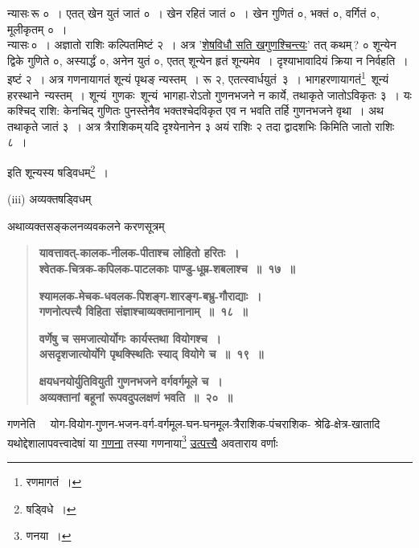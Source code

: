 \documentclass[11pt, openany]{book}
\begin{document}
न्यासः\textendash \,रू ०~। एतत् खेन युतं जातं ०~। खेन रहितं जातं ०~। खेन गुणितं ०, भक्तं ०, वर्गितं ०, मूलीकृतम् ०~।\\

न्यासः\textendash \,०~। अज्ञातो राशिः कल्पितमिष्टं २~। अत्र '\hyperref[13]{शेषविधौ सति खगुणश्चिन्त्यः}' तत् कथम्\,? ० शून्येन द्विके गुणिते ०, अस्यार्द्धं ०, अनेन युतं ०, एतत् शून्येन हृतं शून्यमेव~। दृश्याभावादियं क्रिया न निर्वहति~। इष्टं २~। अत्र गणनायागतं शून्यं पृथङ् न्यस्तम्~। रू २, एतत्स्वार्धयुतं \,३~। भागहरणायागतं\renewcommand{\thefootnote}{३}\footnote{रणमागतं~।} \,शून्यं \,हरस्थाने \,न्यस्तम्~। शून्यं \,गुणकः \,शून्यं \,भागहा-रोऽतो गुणनभजने न कार्ये, तथाकृते जातोऽविकृतः ३~। यः कश्चिद् राशि: केनचिद् गुणितः पुनस्तेनैव भक्तश्चेदविकृत एव न भवति तर्हि गुणनभजने वृथा~। अथ तथाकृते जातं ३~। अत्र त्रैराशिकम्\textendash \,यदि दृश्येनानेन ३ अयं राशिः २ तदा द्वादशभिः किमिति जातो राशिः ८~।

\begin{center}
इति शून्यस्य षड्विधम्\renewcommand{\thefootnote}{४}\footnote{षड्विधे~।}~।
\vspace{4mm}

 \label{avy}
(iii) अव्यक्तषड्विधम् ~~~~
\end{center}

अथाव्यक्तसङ्कलनव्यवकलने करणसूत्रम् \textendash 

\begin{quote}
\textbf{{\color{purple}यावत्तावत्-कालक-नीलक-पीताश्च लोहितो हरितः~। \\
श्वेतक-चित्रक-कपिलक-पाटलकाः पाण्डु-धूम्र-शबलाश्च~॥~१७~॥}}
\vspace{1mm}

 \label{18}
\textbf{{\color{purple}श्यामलक-मेचक-धवलक-पिशङ्ग-शारङ्ग-बभ्रु-गौराद्याः~।\\
गणनोत्पत्त्यै विहिता संज्ञाश्चाव्यक्तमानानाम्~॥~१८~॥}}
\vspace{1mm}

\textbf{{\color{purple}वर्णेषु च समजात्योर्योगः कार्यस्तथा वियोगश्च~।\\ 
असदृशजात्योर्योगे पृथक्स्थितिः स्याद् वियोगे च~॥~१९~॥}}
\vspace{1mm}

\textbf{{\color{purple}क्षयधनयोर्युतिवियुती गुणनभजने वर्गवर्गमूले च~। \\
अव्यक्तानां बहूनां रूपवदुपलक्षणं भवति~॥~२०~॥}}
\end{quote}

गणनेति ~~योग-वियोग-गुणन-भजन-वर्ग-वर्गमूल-घन-घनमूल-त्रैराशिक-पंचराशिक- श्रेढि-क्षेत्र-खातादि यथोद्देशालापवत्त्वादेषां या \hyperref[18]{गणना} तस्या गणनाया\renewcommand{\thefootnote}{५}\footnote{णनया~।} \hyperref[18]{उत्पत्त्यै} अवताराय वर्णाः
\end{document}
